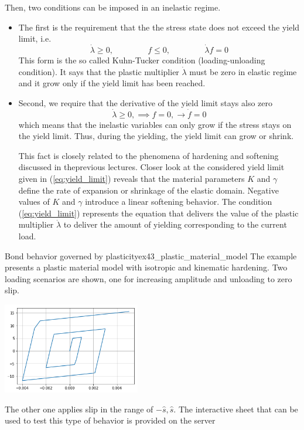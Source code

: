 \documentclass[main.tex]{subfiles}
\begin{document}
Then, two conditions can be imposed in  an inelastic regime. 
\begin{itemize}
    \item
The first is the  requirement that the the stress state does not exceed the yield limit, i.e.
\begin{equation}
\dot{\lambda} \geq 0, \hspace{50pt}  f\leq 0, \hspace{50pt} \dot{\lambda} f = 0
\end{equation}
This form is the so called Kuhn-Tucker condition (loading-unloading condition).
It says that the plastic multiplier $\dot{\lambda}$ must be zero in elastic regime and it grow only if the yield limit has been reached. 
\item
Second, we require that the derivative of the yield limit stays also zero
\begin{equation}
\label{eq:consistency_condition}
\dot{\lambda} \geq 0, \implies   f = 0, \longrightarrow  \dot{f} = 0
\end{equation}
which means that the inelastic variables can only grow if the stress stays on the yield limit. Thus, during the yielding, the yield limit can grow or shrink. 

This fact is closely related to the phenomena of hardening and softening discussed in theprevious lectures. Closer look at the considered yield limit given in (\ref{eq:yield_limit}) reveals that the material parameters $K$ and $\gamma$ define the rate of expansion or shrinkage of the  elastic domain. Negative values of $K$ and $\gamma$ introduce a linear softening behavior. The condition (\ref{eq:yield_limit}) represents the equation that delivers the value of the plastic multiplier $\dot{\lambda}$ to deliver the amount of yielding corresponding to the current load.
\end{itemize}


\begin{bmcsex}{Bond behavior governed by plasticity}{ex43_plastic_material_model}
The example presents a plastic material model with isotropic and kinematic hardening.
Two loading scenarios are shown, one for increasing amplitude and unloading to zero slip.
\begin{center}
\includegraphics[width=6cm]{fig/Lecture04/ep_stress_slip.png}
\end{center}
The other one applies slip in the range of $-\hat{s},\hat{s}$.
The interactive sheet that can be used to test this type of behavior is provided on the server
\end{bmcsex}
\end{document}
